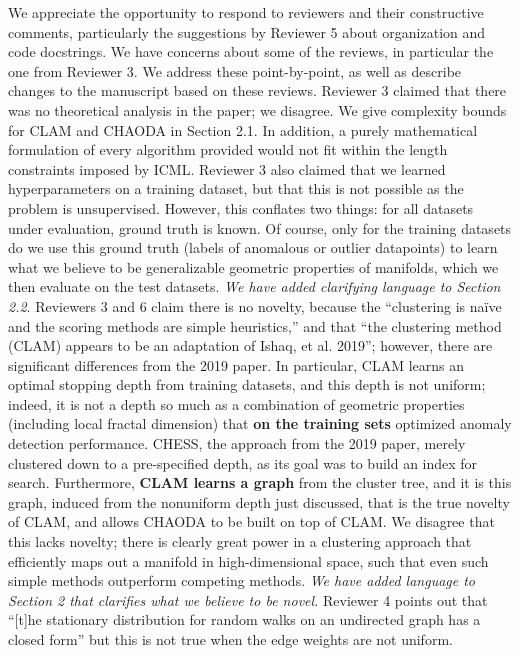 \documentclass{article}
\begin{document}
\onecolumn
We appreciate the opportunity to respond to reviewers and their constructive comments, particularly the suggestions by Reviewer 5 about organization and code docstrings.
We have concerns about some of the reviews, in particular the one from Reviewer 3.
We address these point-by-point, as well as describe changes to the manuscript based on these reviews.
Reviewer 3 claimed that there was no theoretical analysis in the paper; we disagree.
We give complexity bounds for CLAM and CHAODA in Section 2.1.
In addition, a purely mathematical formulation of every algorithm provided would not fit within the length constraints imposed by ICML.
Reviewer 3 also claimed that we learned hyperparameters on a training dataset, but that this is not possible as the problem is unsupervised.
However, this conflates two things: for all datasets under evaluation, ground truth is known.
Of course, only for the training datasets do we use this ground truth (labels of anomalous or outlier datapoints) to learn what we believe to be generalizable geometric properties of manifolds, which we then evaluate on the test datasets.
\emph{We have added clarifying language to Section 2.2}.
Reviewers 3 and 6 claim there is no novelty, because the ``clustering is na\"ive and the scoring methods are simple heuristics,'' and that ``the clustering method (CLAM) appears to be an adaptation of Ishaq, et al. 2019'';
however, there are significant differences from the 2019 paper.
In particular, CLAM learns an optimal stopping depth from training datasets, and this depth is not uniform; indeed, it is not a depth so much as a combination of geometric properties (including local fractal dimension) that \textbf{on the training sets} optimized anomaly detection performance. CHESS, the approach from the 2019 paper, merely clustered down to a pre-specified depth, as its goal was to build an index for search.
Furthermore, \textbf{CLAM learns a graph} from the cluster tree, and it is this graph, induced from the nonuniform depth just discussed, that is the true novelty of CLAM, and allows CHAODA to be built on top of CLAM.
We disagree that this lacks novelty; there is clearly great power in a clustering approach that efficiently maps out a manifold in high-dimensional space, such that even such simple methods outperform competing methods.
\emph{We have added language to Section 2 that clarifies what we believe to be novel.}
Reviewer 4 points out that ``[t]he stationary distribution for random walks on an undirected graph has a closed form'' but this is not true when the edge weights are not uniform.
\end{document}
